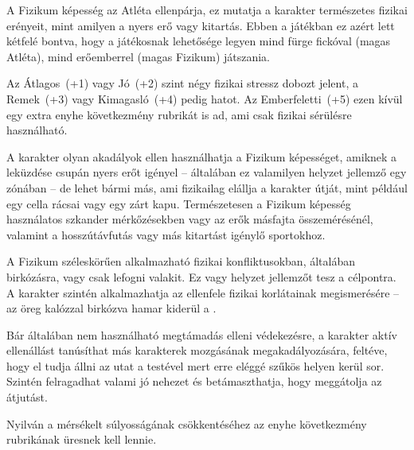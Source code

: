
A Fizikum képesség az Atléta ellenpárja, ez mutatja a karakter természetes fizikai erényeit, mint amilyen a nyers erő vagy kitartás. Ebben a játékban ez azért lett kétfelé bontva, hogy a játékosnak lehetősége legyen mind fürge fickóval (magas Atléta), mind erőemberrel (magas Fizikum) játszania.

Az Átlagos~(+1) vagy Jó~(+2) szint négy fizikai stressz dobozt jelent, a Remek~(+3) vagy Kimagasló~(+4) pedig hatot. Az Emberfeletti~(+5) ezen kívül egy extra enyhe következmény rubrikát is ad, ami csak fizikai sérülésre használható.

\overcome A karakter olyan akadályok ellen használhatja a Fizikum képességet, amiknek a leküzdése csupán nyers erőt igényel -- általában ez valamilyen helyzet jellemző egy zónában -- de lehet bármi más, ami fizikailag elállja a karakter útját, mint például egy cella rácsai vagy egy zárt kapu. Természetesen a Fizikum képesség használatos  szkander mérkőzésekben vagy az erők másfajta összemérésénél, valamint a hosszútávfutás vagy más kitartást igénylő sportokhoz.

\advantage A Fizikum széleskörűen alkalmazható fizikai konfliktusokban, általában birkózásra, vagy csak lefogni valakit. Ez  vagy  helyzet jellemzőt tesz a célpontra. A karakter szintén alkalmazhatja az ellenfele fizikai korlátainak megismerésére -- az öreg kalózzal birkózva hamar kiderül a .


 Bár általában nem használható megtámadás elleni védekezésre, a karakter aktív ellenállást tanúsíthat más karakterek mozgásának megakadályozására, feltéve, hogy el tudja állni az utat a testével mert erre eléggé szűkös helyen kerül sor. Szintén felragadhat valami jó nehezet és betámaszthatja, hogy meggátolja az átjutást.




Nyilván a mérsékelt súlyosságának csökkentéséhez az enyhe következmény rubrikának üresnek kell lennie.
